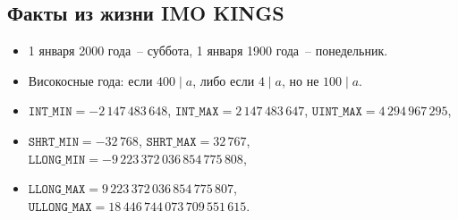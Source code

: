 \documentclass[10pt, portrait,letterpaper]{article}
\begin{document}
\subsection{Факты из жизни IMO KINGS}
\begin{itemize}
    \item 1 января 2000 года~-- суббота, 1 января 1900 года~-- понедельник.
    \item Високосные года: если $400\mid a$, либо если $4\mid a$, но не $100\mid a$.
    \item $\mathtt{INT\_MIN} = -2\,147\,483\,648$, $\mathtt{INT\_MAX} = 2\,147\,483\,647$, $\mathtt{UINT\_MAX} = 4\,294\,967\,295$, 
    \item $\mathtt{SHRT\_MIN} = -32\,768$, $\mathtt{SHRT\_MAX} = 32\,767$, $\mathtt{LLONG\_MIN} = -9\,223\,372\,036\,854\,775\,808$,
    \item $\mathtt{LLONG\_MAX} = 9\,223\,372\,036\,854\,775\,807$, $\mathtt{ULLONG\_MAX} = 18\,446\,744\,073\,709\,551\,615$.
\end{itemize}
\end{document}
